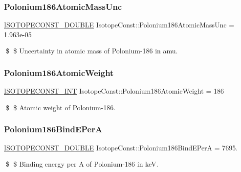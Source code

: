 \subsubsection{\texorpdfstring{Polonium186\+Atomic\+Mass\+Unc}{Polonium186AtomicMassUnc}}
{\footnotesize\ttfamily \mbox{\hyperlink{group___isotope_const-_macros_ga8f45a7272ce02c0b4c65c44636ed719a}{I\+S\+O\+T\+O\+P\+E\+C\+O\+N\+S\+T\+\_\+\+D\+O\+U\+B\+LE}} Isotope\+Const\+::\+Polonium186\+Atomic\+Mass\+Unc = 1.\+963e-\/05}

\$ \$ Uncertainty in atomic mass of Polonium-\/186 in amu. \mbox{\label{group___isotope_const-_polonium-_po186_gaf3d09806411f980abc433702e3959f42}} 
\subsubsection{\texorpdfstring{Polonium186\+Atomic\+Weight}{Polonium186AtomicWeight}}
{\footnotesize\ttfamily \mbox{\hyperlink{group___isotope_const-_macros_ga5f18360b3e99483a35c32d789e62621c}{I\+S\+O\+T\+O\+P\+E\+C\+O\+N\+S\+T\+\_\+\+I\+NT}} Isotope\+Const\+::\+Polonium186\+Atomic\+Weight = 186}

\$ \$ Atomic weight of Polonium-\/186. \mbox{\label{group___isotope_const-_polonium-_po186_gab79ed947b7c5b61114f0cfcb67d1da5d}} 
\subsubsection{\texorpdfstring{Polonium186\+Bind\+E\+PerA}{Polonium186BindEPerA}}
{\footnotesize\ttfamily \mbox{\hyperlink{group___isotope_const-_macros_ga8f45a7272ce02c0b4c65c44636ed719a}{I\+S\+O\+T\+O\+P\+E\+C\+O\+N\+S\+T\+\_\+\+D\+O\+U\+B\+LE}} Isotope\+Const\+::\+Polonium186\+Bind\+E\+PerA = 7695.}

\$ \$ Binding energy per A of Polonium-\/186 in keV. \mbox{\label{group___isotope_const-_polonium-_po186_ga8c20267aeb39f5eb4d8e0422eba7050c}} 

